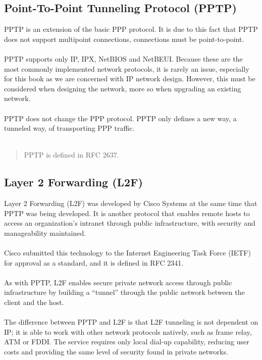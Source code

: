 \documentclass[10pt,a4paper]{article}
\begin{document}
\begin{itemize}
\begin{itemize}
\section{Point-To-Point Tunneling Protocol (PPTP)}

PPTP is an extension of the basic PPP protocol. It is due to this
fact that PPTP does not support multipoint connections, connections must be
point-to-point.
\\
\\
PPTP supports only IP, IPX, NetBIOS and NetBEUI. Because these are the most
commonly implemented network protocols, it is rarely an issue, especially for this
book as we are concerned with IP network design. However, this must be
considered when designing the network, more so when upgrading an existing
network.
\\
\\
PPTP does not change the PPP protocol. PPTP only defines a new way, a
tunneled way, of transporting PPP traffic.
\\
\\
\begin{quote}
PPTP is defined in RFC 2637.
\end{quote}


\subsection{Layer 2 Forwarding (L2F)}
Layer 2 Forwarding (L2F) was developed by Cisco Systems at the same time that
PPTP was being developed. It is another protocol that enables remote hosts to
access an organization’s intranet through public infrastructure, with security and
manageability maintained.
\\
\\
Cisco submitted this technology to the Internet Engineering Task Force (IETF) for
approval as a standard, and it is defined in RFC 2341.
\\
\\
As with PPTP, L2F enables secure private network access through public
infrastructure by building a “tunnel” through the public network between the client
and the host. 
\\
\\
The difference between PPTP and L2F is that L2F tunneling is not
dependent on IP; it is able to work with other network protocols natively, such as
frame relay, ATM or FDDI. The service requires only local dial-up capability, reducing user costs and providing the same level of security found in private
networks.


\end{itemize}
\end{itemize}
\end{document}
